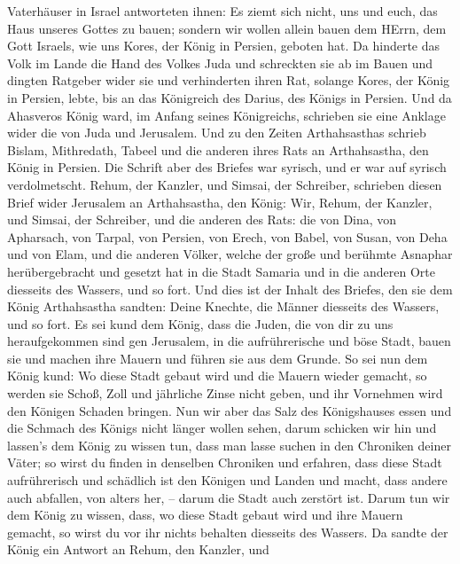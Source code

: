 Vaterhäuser in Israel antworteten ihnen: Es ziemt sich nicht, uns und
euch, das Haus unseres Gottes zu bauen; sondern wir wollen allein bauen
dem HErrn, dem Gott Israels, wie uns Kores, der König in Persien,
geboten hat.  Da hinderte das Volk im Lande die Hand des
Volkes Juda und schreckten sie ab im Bauen  und dingten
Ratgeber wider sie und verhinderten ihren Rat, solange Kores, der König
in Persien, lebte, bis an das Königreich des Darius, des Königs in
Persien.  Und da Ahasveros König ward, im Anfang seines
Königreichs, schrieben sie eine Anklage wider die von Juda und
Jerusalem.  Und zu den Zeiten Arthahsasthas schrieb Bislam,
Mithredath, Tabeel und die anderen ihres Rats an Arthahsastha, den König
in Persien. Die Schrift aber des Briefes war syrisch, und er war auf
syrisch verdolmetscht.  Rehum, der Kanzler, und Simsai, der
Schreiber, schrieben diesen Brief wider Jerusalem an Arthahsastha, den
König:  Wir, Rehum, der Kanzler, und Simsai, der Schreiber,
und die anderen des Rats: die von Dina, von Apharsach, von Tarpal, von
Persien, von Erech, von Babel, von Susan, von Deha und von Elam,
 und die anderen Völker, welche der große und berühmte
Asnaphar herübergebracht und gesetzt hat in die Stadt Samaria und in die
anderen Orte diesseits des Wassers, und so fort.  Und dies
ist der Inhalt des Briefes, den sie dem König Arthahsastha sandten:
Deine Knechte, die Männer diesseits des Wassers, und so fort.
 Es sei kund dem König, dass die Juden, die von dir zu uns
heraufgekommen sind gen Jerusalem, in die aufrührerische und böse Stadt,
bauen sie und machen ihre Mauern und führen sie aus dem Grunde.
 So sei nun dem König kund: Wo diese Stadt gebaut wird und
die Mauern wieder gemacht, so werden sie Schoß, Zoll und jährliche Zinse
nicht geben, und ihr Vornehmen wird den Königen Schaden bringen.
 Nun wir aber das Salz des Königshauses essen und die
Schmach des Königs nicht länger wollen sehen, darum schicken wir hin und
lassen's dem König zu wissen tun,  dass man lasse suchen in
den Chroniken deiner Väter; so wirst du finden in denselben Chroniken
und erfahren, dass diese Stadt aufrührerisch und schädlich ist den
Königen und Landen und macht, dass andere auch abfallen, von alters her,
-- darum die Stadt auch zerstört ist.  Darum tun wir dem
König zu wissen, dass, wo diese Stadt gebaut wird und ihre Mauern
gemacht, so wirst du vor ihr nichts behalten diesseits des Wassers.
 Da sandte der König ein Antwort an Rehum, den Kanzler, und
